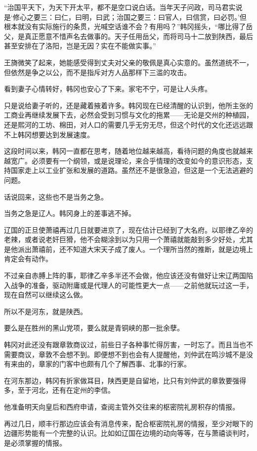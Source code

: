 “治国平天下，为天下开太平，都不是空口说白话。当年天子问政，司马君实说是‘修心之要三：曰仁，曰明，曰武；治国之要三：曰官人，曰信赏，曰必罚。’但根本就没有实际施行的条贯，光喊空话谁不会？有用吗？”韩冈摇头，“哪比得了岳父，是真正愿意不惜声名去做事的。天子任用岳父，而将司马十二放到陕西，最后甚至安排在了洛阳，岂是无因？实在不能做实事。”

王旖微笑了起来，她能感受得到丈夫对父亲的敬佩是真心实意的。虽然道统不一，但依然是争之以公，而不是指斥对方人品那样下三滥的攻击。

看到妻子心情转好，韩冈也安心了下来。家宅不宁，可是让人头疼。

只是说给妻子听的，还是藏着掖着许多。韩冈现在已经清醒的认识到，他所主张的工商业再继续发展下去，必然会受到习惯与文化的拖累——无论是交州的种植园，还是熙河的工坊、棉田，对人口的需要几乎无穷无尽，但这个时代的文化还远远跟不上韩冈想要达到发展速度。

这段时间以来，韩冈一直都在思考，随着地位越来越高，看待问题的角度也就越来越宽广。必须要有一个纲领，或是说理论，来合乎情理的改变如今的意识形态，支持国家走上以工业扩张和发展的道路。虽然还不是很急迫，但这是一个无法逃避的问题。

话说回来，这些也不是当务之急。

当务之急是辽人。韩冈身上的差事逃不掉。

辽国的正旦使萧禧再过几日就要进京了，现在估计已经到了大名府。以耶律乙辛的老辣，或者说老奸巨猾，他不会糊涂到以为只用一个萧禧就能敲到多少好处，尤其是他派出萧禧前，还不知道大宋天子成了废人。一个理所当然的推断，就是边境上肯定会有动作。

不过亲自赤膊上阵的事，耶律乙辛多半还不会做，他应该还没有做好让宋辽两国陷入战争的准备，驱动附庸或是代理人的可能性更大一点——之前他就玩过这一手，现在自然可以继续这么做。

所以不是河东，就是陕西。

要么是在胜州的黑山党项，要么就是青铜峡的那一批余孽。

韩冈对此还没有跟章敦商议过，前些日子各种事忙得厉害，一时忘了。而且当也不需要商议，章敦不会想不到。即便想不到也会有人提醒他，刘仲武在鸣沙城不是没有来由的，章家的门客中也颇有几个了解西事、北事的行家。

在河东那边，韩冈有折家做耳目，陕西更是自留地，比只有刘仲武的章敦要强得多，至于河北，还有在定州的李信。

他准备明天向皇后和西府申请，查阅主管外交往来的枢密院礼房积存的情报。

再过几日，顺丰行那边应该会有消息传来，配合枢密院礼房的情报，至少对眼下的边疆形势能有一个完整的认识。比如如辽国在边境的动向等等，在与萧禧谈判时，是必须掌握的情报。

